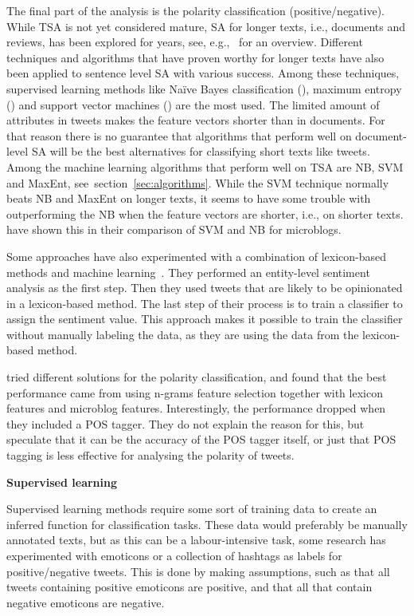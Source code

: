 The final part of the analysis is the polarity classification (positive/negative). While TSA is not yet considered mature, SA for longer texts, i.e., documents and reviews, has been explored for years, see, e.g.,~\cite{book:pang} for an overview. Different techniques and algorithms that have proven worthy for longer texts have also been applied to sentence level SA with various success. Among these techniques, supervised learning methods like Na\"{i}ve Bayes classification (), maximum entropy () and support vector machines () are the most used. The limited amount of attributes in tweets makes the feature vectors shorter than in documents. For that reason there is no guarantee that algorithms that perform well on document-level SA will be the best alternatives for classifying short texts like tweets. Among the machine learning algorithms that perform well on TSA are NB, SVM and MaxEnt, see~section~\ref{sec:algorithms}. While the SVM technique normally beats NB and MaxEnt on longer texts, it seems to have some trouble with outperforming the NB when the feature vectors are shorter, i.e., on shorter texts. \cite{article:bermingham} have shown this in their comparison of SVM and NB for microblogs.

Some approaches have also experimented with a combination of lexicon-based methods and  machine learning~\citep{article:mudinas}. They performed an entity-level sentiment analysis as the first step. Then they used tweets that are likely to be opinionated in a lexicon-based method. The last step of their process is to train a classifier to assign the sentiment value. This approach makes it possible to train the classifier without manually labeling the data, as they are using the data from the lexicon-based method.

\cite{article:omg} tried different solutions for the polarity classification, and found that the best performance came from using n-grams feature selection together with lexicon features and microblog features. Interestingly, the performance dropped when they included a POS tagger. They do not explain the reason for this, but speculate that it can be the accuracy of the POS tagger itself, or just that POS tagging is less effective for analysing the polarity of tweets.

\noindent
\textbf{Supervised learning} \\
\noindent

Supervised learning methods require some sort of training data to create an inferred function for classification tasks. These data would preferably be manually annotated texts, but as this can be a labour-intensive task, some research has experimented with emoticons or a collection of hashtags as labels for positive/negative tweets. This is done by making assumptions, such as that all tweets containing positive emoticons are positive, and that all that contain negative emoticons are negative.

